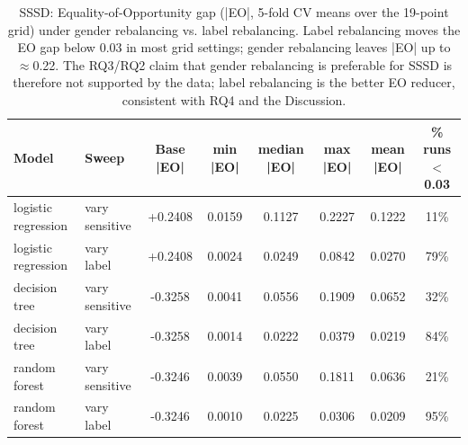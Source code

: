 \begin{table}[ht]
\centering\footnotesize
\caption{SSSD: Equality-of-Opportunity gap (|EO|, 5-fold CV means over the 19-point
grid) under gender rebalancing vs. label rebalancing. Label rebalancing moves the
EO gap below 0.03 in most grid settings; gender rebalancing leaves |EO| up to
$\approx$0.22. The RQ3/RQ2 claim that gender rebalancing is preferable for SSSD
is therefore not supported by the data; label rebalancing is the better EO
reducer, consistent with RQ4 and the Discussion.}
\label{tab:sssd_eo}
\begin{tabular}{l l c c c c c c}
\toprule
Model & Sweep & Base |EO| & min |EO| & median |EO| & max |EO| & mean |EO| & \% runs $<$0.03 \\
\midrule
logistic regression  & vary sensitive & +0.2408 & 0.0159 & 0.1127 & 0.2227 & 0.1222 & 11\% \\
logistic regression  & vary label     & +0.2408 & 0.0024 & 0.0249 & 0.0842 & 0.0270 & 79\% \\
decision tree        & vary sensitive & -0.3258 & 0.0041 & 0.0556 & 0.1909 & 0.0652 & 32\% \\
decision tree        & vary label     & -0.3258 & 0.0014 & 0.0222 & 0.0379 & 0.0219 & 84\% \\
random forest        & vary sensitive & -0.3246 & 0.0039 & 0.0550 & 0.1811 & 0.0636 & 21\% \\
random forest        & vary label     & -0.3246 & 0.0010 & 0.0225 & 0.0306 & 0.0209 & 95\% \\\bottomrule
\end{tabular}
\end{table}

